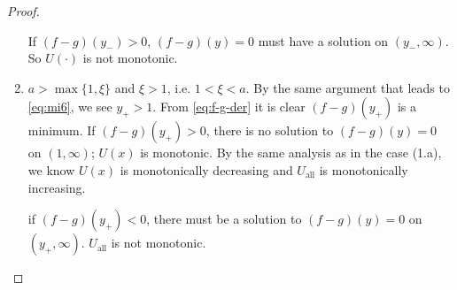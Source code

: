 \documentclass[11pt,a4]{amsart}
\newcommand{\1}{{\mathbf 1}}
\begin{document}
\begin{proof}
\begin{enumerate}
    If $(f-g)(y_-) > 0$, $(f-g)(y) = 0$ must have a solution on $(y_-,
    \infty)$. So $U(\cdot)$ is not monotonic.

    \item $a > \max\{1, \xi\}$ and $\xi > 1$, i.e. $1 < \xi < a$. By
      the same argument that leads to \eqref{eq:mi6}, we see
      $y_+ > 1$. From \eqref{eq:f-g-der} it is clear $(f-g)(y_+)$ is a
      minimum. If $(f-g)(y_+) > 0$, there is no solution to
      $(f-g)(y) = 0$ on $(1, \infty)$; $U(x)$ is monotonic. By the
      same analysis as in the case (1.a), we know $U(x)$ is
      monotonically decreasing and $U_{\text{all}}$ is monotonically increasing.
      
      if $(f-g)(y_+) < 0$, there must be a solution to $(f-g)(y) = 0$
      on $(y_+, \infty)$. $U_{\text{all}}$ is not monotonic.
  \end{enumerate}
\end{proof}



\end{document}
